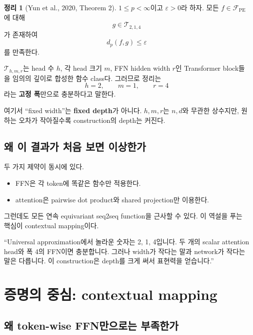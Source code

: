 \documentclass[11pt,a4paper,oneside,openany]{memoir}
\theoremstyle{definition}
\newtheorem{theorem}{정리}[chapter]
\begin{document}
\begin{theorem}[Yun et al., 2020, Theorem 2]
$1\le p<\infty$이고 $\varepsilon>0$라 하자.
모든 $f\in\mathcal F_{\mathrm{PE}}$에 대해
\[
g\in\mathcal T_{2,1,4}
\]
가 존재하여
\[
d_p(f,g)\le\varepsilon
\]
를 만족한다.
\end{theorem}

$\mathcal T_{h,m,r}$는 head 수 $h$, 각 head 크기 $m$, FFN hidden width $r$인 Transformer block들을 임의의 깊이로 합성한 함수 class다.
그러므로 정리는
\[
h=2,\qquad m=1,\qquad r=4
\]
라는 \textbf{고정 폭}만으로 충분하다고 말한다.

\begin{keybox}
여기서 ``fixed width''는 \textbf{fixed depth}가 아니다.
$h,m,r$는 $n,d$와 무관한 상수지만, 원하는 오차가 작아질수록 construction의 depth는 커진다.
\end{keybox}

\section{왜 이 결과가 처음 보면 이상한가}

두 가지 제약이 동시에 있다.

\begin{itemize}
  \item FFN은 각 token에 똑같은 함수만 적용한다.
  \item attention은 pairwise dot product와 shared projection만 이용한다.
\end{itemize}

그런데도 모든 연속 equivariant seq2seq function을 근사할 수 있다.
이 역설을 푸는 핵심이 contextual mapping이다.

\begin{presentbox}
``Universal approximation에서 놀라운 숫자는 2, 1, 4입니다. 두 개의 scalar attention head와 폭 4의 FFN이면 충분합니다. 그러나 width가 작다는 말과 network가 작다는 말은 다릅니다. 이 construction은 depth를 크게 써서 표현력을 얻습니다.''
\end{presentbox}

\chapter{증명의 중심: contextual mapping}

\section{왜 token-wise FFN만으로는 부족한가}
\end{document}
